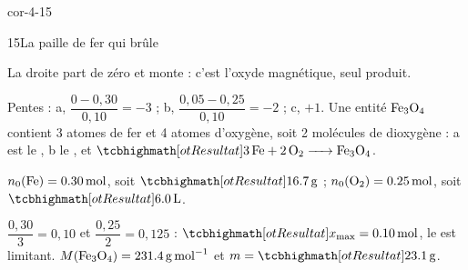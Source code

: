 \begin{blocLivre}{cor-4-15}
\begin{corrige}{15}{La paille de fer qui brûle}
\begin{questions}
\item La droite  part de zéro et monte : c'est l'oxyde magnétique, seul produit.
\item Pentes : a, $\dfrac{0-0{,}30}{0{,}10}=-3$ ; b, $\dfrac{0{,}05-0{,}25}{0{,}10}=-2$ ; c, $+1$. Une entité $\ce{Fe3O4}$ contient 3 atomes de fer et 4 atomes
d'oxygène, soit 2 molécules de dioxygène : a est le , b le , et $\res{\ce{3Fe + 2O2 -> Fe3O4}}$.
\item $n_0(\ce{Fe})=\qty{0,30}{mol}$, soit $\res{\qty{16,7}{g}}$ ; $n_0(\ce{O2})=\qty{0,25}{mol}$, soit $\res{\qty{6,0}{L}}$.
\item $\dfrac{0{,}30}{3}=0{,}10$ et $\dfrac{0{,}25}{2}=0{,}125$ : $\res{x_\mathrm{max}=\qty{0,10}{mol}}$, le  est limitant. $M(\ce{Fe3O4})=\qty{231,4}{g.mol^{-1}}$ et
$m=\res{\qty{23,1}{g}}$.
\end{questions}
\end{corrige}
\end{blocLivre}
